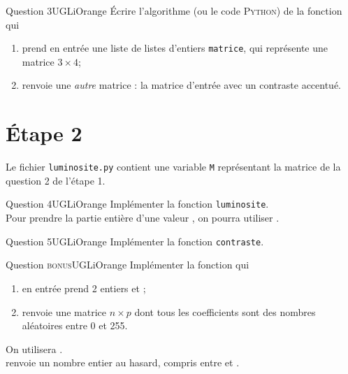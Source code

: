 \begin{encadrecolore}{Question 3}{UGLiOrange}
\'Ecrire l'algorithme (ou le code \textsc{Python}) de la fonction  qui 
\begin{enumerate}[--]
	\item prend en entrée une liste de listes d'entiers \texttt{matrice}, qui représente une matrice $3\times 4$;
    \item renvoie une \textit{autre} matrice : la matrice d'entrée avec un contraste accentué.
\end{enumerate}

\end{encadrecolore} 

\section*{\'Etape 2}

Le fichier \texttt{luminosite.py} contient une variable \texttt{M} représentant la matrice de la question 2 de l'étape 1.


\begin{encadrecolore}{Question 4}{UGLiOrange}
Implémenter la fonction \texttt{luminosite}.\\
Pour prendre la partie entière d'une valeur , on pourra utiliser .
\end{encadrecolore} 

\begin{encadrecolore}{Question 5}{UGLiOrange}
Implémenter la fonction \texttt{contraste}.
\end{encadrecolore} 

\begin{encadrecolore}{Question \textsc{bonus}}{UGLiOrange}
Implémenter la fonction  qui
\begin{enumerate}[--]
	\item en entrée prend 2 entiers  et ;
    \item renvoie une matrice $n\times p$ dont tous les coefficients sont des nombres aléatoires entre 0 et 255.
\end{enumerate}
On utilisera .\\
 renvoie un nombre entier au hasard, compris entre  et .
\end{encadrecolore} 

